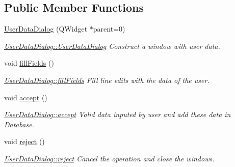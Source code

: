 \subsection*{Public Member Functions}
\begin{DoxyCompactItemize}
\item 
\hyperlink{classGui_1_1Dialogs_1_1UserDataDialog_a3cafa419d49d124e72511a3b91f8ee76}{User\+Data\+Dialog} (Q\+Widget $\ast$parent=0)
\begin{DoxyCompactList}\small\item\em \hyperlink{classGui_1_1Dialogs_1_1UserDataDialog_a3cafa419d49d124e72511a3b91f8ee76}{User\+Data\+Dialog\+::\+User\+Data\+Dialog} Construct a window with user data. \end{DoxyCompactList}\item 
\hypertarget{classGui_1_1Dialogs_1_1UserDataDialog_ae1a17e6547a30b03ba2c837ba0b28455}{}void \hyperlink{classGui_1_1Dialogs_1_1UserDataDialog_ae1a17e6547a30b03ba2c837ba0b28455}{fill\+Fields} ()\label{classGui_1_1Dialogs_1_1UserDataDialog_ae1a17e6547a30b03ba2c837ba0b28455}

\begin{DoxyCompactList}\small\item\em \hyperlink{classGui_1_1Dialogs_1_1UserDataDialog_ae1a17e6547a30b03ba2c837ba0b28455}{User\+Data\+Dialog\+::fill\+Fields} Fill line edits with the data of the user. \end{DoxyCompactList}\item 
\hypertarget{classGui_1_1Dialogs_1_1UserDataDialog_a2d3841c471d0ddfd58610d3667d8521a}{}void \hyperlink{classGui_1_1Dialogs_1_1UserDataDialog_a2d3841c471d0ddfd58610d3667d8521a}{accept} ()\label{classGui_1_1Dialogs_1_1UserDataDialog_a2d3841c471d0ddfd58610d3667d8521a}

\begin{DoxyCompactList}\small\item\em \hyperlink{classGui_1_1Dialogs_1_1UserDataDialog_a2d3841c471d0ddfd58610d3667d8521a}{User\+Data\+Dialog\+::accept} Valid data inputed by user and add these data in Database. \end{DoxyCompactList}\item 
\hypertarget{classGui_1_1Dialogs_1_1UserDataDialog_a919f59546670019bb4e72fcd0c7ea841}{}void \hyperlink{classGui_1_1Dialogs_1_1UserDataDialog_a919f59546670019bb4e72fcd0c7ea841}{reject} ()\label{classGui_1_1Dialogs_1_1UserDataDialog_a919f59546670019bb4e72fcd0c7ea841}

\begin{DoxyCompactList}\small\item\em \hyperlink{classGui_1_1Dialogs_1_1UserDataDialog_a919f59546670019bb4e72fcd0c7ea841}{User\+Data\+Dialog\+::reject} Cancel the operation and close the windows. \end{DoxyCompactList}\end{DoxyCompactItemize}


